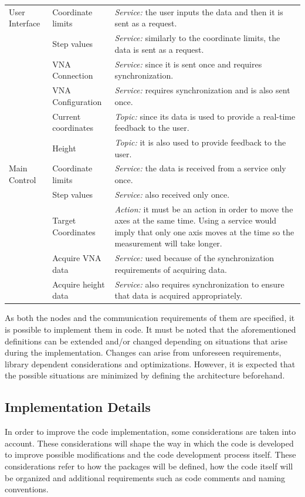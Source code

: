 \documentclass{article}
\begin{document}
\begin{singlespace}
\begin{longtable}{|l|l|p{10cm}|}
        User Interface & Coordinate limits & \textit{Service:} the user inputs the data and then it is sent as a request. \\ \cline{2-3}
        & Step values & \textit{Service:} similarly to the coordinate limits, the data is sent as a request. \\ \cline{2-3}
        & VNA Connection & \textit{Service:} since it is sent once and requires synchronization.\\ \cline{2-3}
        & VNA Configuration & \textit{Service:} requires synchronization and is also sent once. \\ \cline{2-3}
        & Current coordinates & \textit{Topic:} since its data is used to provide a real-time feedback to the user. \\ \cline{2-3}
        & Height & \textit{Topic:} it is also used to provide feedback to the user. \\ \hline
        Main Control & Coordinate limits & \textit{Service:} the data is received from a service only once. \\ \cline{2-3}
        & Step values & \textit{Service:} also received only once. \\ \cline{2-3}
        & Target Coordinates & \textit{Action:} it must be an action in order to move the axes at the same time. Using a service would imply that only one axis moves at the time so the measurement will take longer. \\ \cline{2-3}
        & Acquire VNA data & \textit{Service:} used because of the synchronization requirements of acquiring data. \\ \cline{2-3}
        & Acquire height data & \textit{Service:} also requires synchronization to ensure that data is acquired appropriately. \\ \hline
    \end{longtable}
\end{singlespace}

As both the nodes and the communication requirements of them are specified, it is possible to implement them in code. It must be noted that the aforementioned definitions can be extended and/or changed depending on situations that arise during the implementation. Changes can arise from unforeseen requirements, library dependent considerations and optimizations. However, it is expected that the possible situations are minimized by defining the architecture beforehand.

\subsection{Implementation Details}
In order to improve the code implementation, some considerations are taken into account. These considerations will shape the way in which the code is developed to improve possible modifications and the code development process itself. These considerations refer to how the packages will be defined, how the code itself will be organized and additional requirements such as code comments and naming conventions. 
\end{document}
